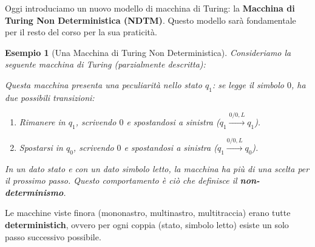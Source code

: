 \documentclass[a4paper, 11pt]{book} %
\newtheorem{example}[theorem]{Esempio}
\theoremstyle{definition}
\begin{document}
Oggi introduciamo un nuovo modello di macchina di Turing: la \textbf{Macchina di Turing Non Deterministica (NDTM)}. Questo modello sarà fondamentale per il resto del corso per la sua praticità.

\begin{example}[Una Macchina di Turing Non Deterministica]
Consideriamo la seguente macchina di Turing (parzialmente descritta):
\begin{center}
\end{center}
Questa macchina presenta una peculiarità nello stato $q_1$: se legge il simbolo $0$, ha due possibili transizioni:
\begin{enumerate}
    \item Rimanere in $q_1$, scrivendo $0$ e spostandosi a sinistra ($q_1 \xrightarrow{0/0, L} q_1$).
    \item Spostarsi in $q_0$, scrivendo $0$ e spostandosi a sinistra ($q_1 \xrightarrow{0/0, L} q_0$).
\end{enumerate}
In un dato stato e con un dato simbolo letto, la macchina ha più di una scelta per il prossimo passo. Questo comportamento è ciò che definisce il \textbf{non-determinismo}.
\end{example}

Le macchine viste finora (mononastro, multinastro, multitraccia) erano tutte \textbf{deterministich}, ovvero per ogni coppia (stato, simbolo letto) esiste un solo passo successivo possibile.
\end{document}
